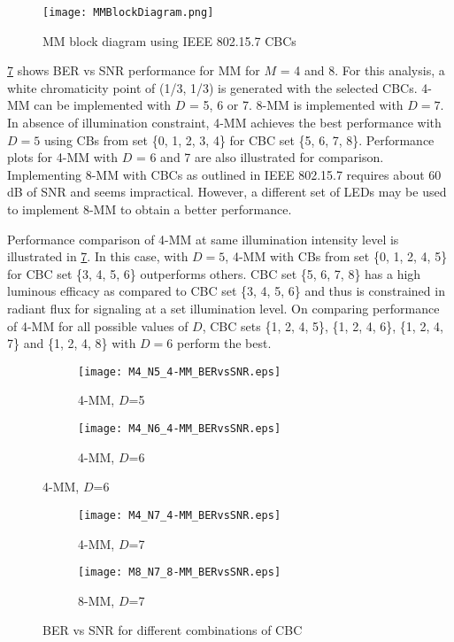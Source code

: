 \begin{figure}[!t]
	\centering
    \texttt{[image: MMBlockDiagram.png]}
	\caption{MM block diagram using IEEE 802.15.7 CBCs}
	\label{figMMBD}
\end{figure}


\figurename{ \ref{figMM_BERvsSNR}} shows BER vs SNR performance for MM for $M$ = 4 and 8. For this analysis, a white chromaticity point of (1/3, 1/3) is generated with the selected CBCs. 4-MM can be implemented with $D$ = 5, 6 or 7. 8-MM is implemented with $D=7$. In absence of illumination constraint, 4-MM achieves the best performance with $D=5$ using CBs from set \{0, 1, 2, 3, 4\} for CBC set \{5, 6, 7, 8\}. Performance plots for 4-MM with $D$ = 6 and 7 are also illustrated for comparison. Implementing 8-MM with CBCs as outlined in IEEE 802.15.7 requires about 60 dB of SNR and seems impractical. However, a different set of LEDs may be used to implement 8-MM to obtain a better performance.

Performance comparison of 4-MM at same illumination intensity level is illustrated in \figurename{ \ref{figMM_BERvsSNR}}. In this case, with $D=5$, 4-MM with CBs from set \{0, 1, 2, 4, 5\} for CBC set \{3, 4, 5, 6\} outperforms others.  CBC set \{5, 6, 7, 8\} has a high luminous efficacy as compared to  CBC set \{3, 4, 5, 6\} and thus is constrained in radiant flux for signaling at a set illumination level. On comparing performance of 4-MM for all possible values of $D$, CBC sets \{1, 2, 4, 5\}, \{1, 2, 4, 6\}, \{1, 2, 4, 7\} and \{1, 2, 4, 8\} with $D=6$ perform the best.
\begin{figure}[H]
	\centering
		\begin{subfigure}{\textwidth}
		\centering
			\texttt{[image: M4\_N5\_4-MM\_BERvsSNR.eps]}
			\caption{4-MM, $D$=5}
			\label{fig4MM5}
		\end{subfigure}
		\begin{subfigure}{\textwidth}
		\centering
			\texttt{[image: M4\_N6\_4-MM\_BERvsSNR.eps]}
			\caption{4-MM, $D$=6}
			\label{fig4MM6}
		\end{subfigure}
\end{figure}
\begin{figure}[H]
		\ContinuedFloat
		\begin{subfigure}{\textwidth}
		\centering
			\texttt{[image: M4\_N7\_4-MM\_BERvsSNR.eps]}
			\caption{4-MM, $D$=7}
			\label{fig4MM7}
		\end{subfigure}
		\begin{subfigure}{\textwidth}
		\centering
			\texttt{[image: M8\_N7\_8-MM\_BERvsSNR.eps]}
			\caption{8-MM, $D$=7}
			\label{fig8MM7}
		\end{subfigure}
	\caption{BER vs SNR for different combinations of CBC}
	\label{figMM_BERvsSNR}
\end{figure}

